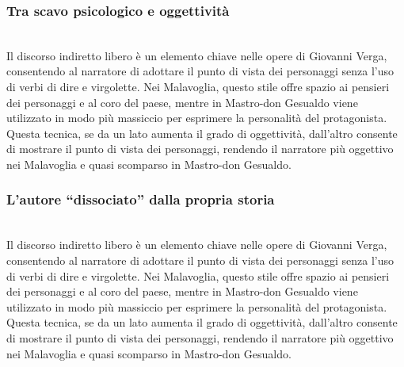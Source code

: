 \documentclass{report}
\begin{document}
\subsubsection{Tra scavo psicologico e oggettività}
\\
Il discorso indiretto libero è un elemento chiave nelle opere di Giovanni Verga, consentendo al narratore di adottare il punto di vista dei personaggi senza l'uso di verbi di dire e virgolette. Nei Malavoglia, questo stile offre spazio ai pensieri dei personaggi e al coro del paese, mentre in Mastro-don Gesualdo viene utilizzato in modo più massiccio per esprimere la personalità del protagonista. Questa tecnica, se da un lato aumenta il grado di oggettività, dall'altro consente di mostrare il punto di vista dei personaggi, rendendo il narratore più oggettivo nei Malavoglia e quasi scomparso in Mastro-don Gesualdo.
\\
\subsubsection{L’autore “dissociato” dalla propria storia}
\\
Il discorso indiretto libero è un elemento chiave nelle opere di Giovanni Verga, consentendo al narratore di adottare il punto di vista dei personaggi senza l'uso di verbi di dire e virgolette. Nei Malavoglia, questo stile offre spazio ai pensieri dei personaggi e al coro del paese, mentre in Mastro-don Gesualdo viene utilizzato in modo più massiccio per esprimere la personalità del protagonista. Questa tecnica, se da un lato aumenta il grado di oggettività, dall'altro consente di mostrare il punto di vista dei personaggi, rendendo il narratore più oggettivo nei Malavoglia e quasi scomparso in Mastro-don Gesualdo.
\\
\end{document}
